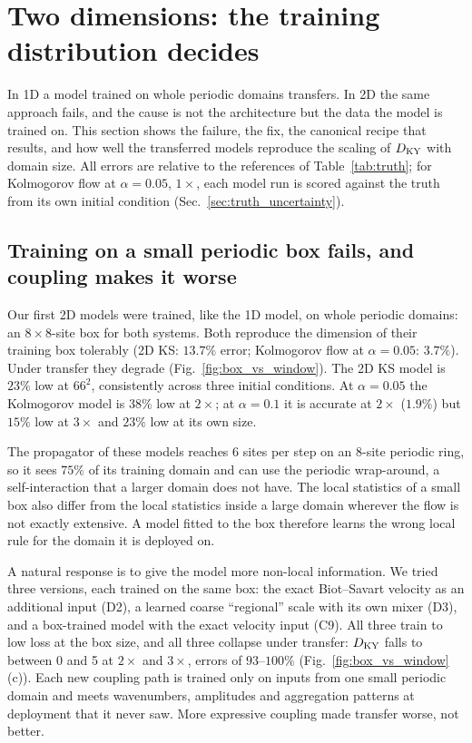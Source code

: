 \section{Two dimensions: the training distribution decides}
\label{sec:results2d}

In 1D a model trained on whole periodic domains transfers. In 2D the same
approach fails, and the cause is not the architecture but the data the
model is trained on. This section shows the failure, the fix, the
canonical recipe that results, and how well the transferred models
reproduce the scaling of $D_{\mathrm{KY}}$ with domain size. All errors are relative
to the references of Table~\ref{tab:truth}; for Kolmogorov flow at
$\alpha=0.05$, $1\times$, each model run is scored against the truth from
its own initial condition (Sec.~\ref{sec:truth_uncertainty}).

\subsection{Training on a small periodic box fails, and coupling makes it worse}
\label{sec:box_vs_window}

Our first 2D models were trained, like the 1D model, on whole periodic
domains: an $8\times8$-site box for both systems. Both reproduce the
dimension of their training box tolerably (2D KS: $13.7\%$ error;
Kolmogorov flow at $\alpha=0.05$: $3.7\%$). Under transfer they degrade
(Fig.~\ref{fig:box_vs_window}). The 2D KS model is $23\%$ low at $66^2$,
consistently across three initial conditions. At $\alpha=0.05$ the
Kolmogorov model is $38\%$ low at $2\times$; at $\alpha=0.1$ it is
accurate at $2\times$ ($1.9\%$) but $15\%$ low at $3\times$ and $23\%$ low at
its own size.

The propagator of these models reaches 6 sites per step on an 8-site
periodic ring, so it sees $75\%$ of its training domain and can use the
periodic wrap-around, a self-interaction that a larger domain does not
have. The local statistics of a small box also differ from the local
statistics inside a large domain wherever the flow is not exactly
extensive. A model fitted to the box therefore learns the wrong local
rule for the domain it is deployed on.

A natural response is to give the model more non-local information. We
tried three versions, each trained on the same box: the exact
Biot--Savart velocity as an additional input (D2), a learned coarse
``regional'' scale with its own mixer (D3), and a box-trained model with
the exact velocity input (C9). All three train to low loss at the box
size, and all three collapse under transfer: $D_{\mathrm{KY}}$ falls to between 0
and 5 at $2\times$ and $3\times$, errors of $93$--$100\%$
(Fig.~\ref{fig:box_vs_window}(c)). Each new coupling path is trained only
on inputs from one small periodic domain and meets wavenumbers,
amplitudes and aggregation patterns at deployment that it never saw.
More expressive coupling made transfer worse, not better.

